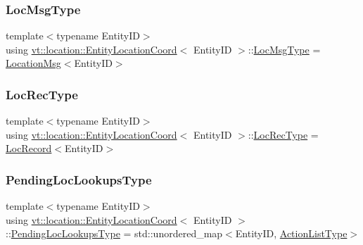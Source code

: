 \subsubsection{\texorpdfstring{Loc\+Msg\+Type}{LocMsgType}}
{\footnotesize\ttfamily template$<$typename Entity\+ID$>$ \\
using \hyperlink{structvt_1_1location_1_1_entity_location_coord}{vt\+::location\+::\+Entity\+Location\+Coord}$<$ Entity\+ID $>$\+::\hyperlink{structvt_1_1location_1_1_entity_location_coord_a8799cbd5fb0fb04cfdd1012fe1d5908f}{Loc\+Msg\+Type} =  \hyperlink{structvt_1_1location_1_1_location_msg}{Location\+Msg}$<$Entity\+ID$>$}

\mbox{\label{structvt_1_1location_1_1_entity_location_coord_a685f9eee868b7b9e01072a5b303548bc}} 
\subsubsection{\texorpdfstring{Loc\+Rec\+Type}{LocRecType}}
{\footnotesize\ttfamily template$<$typename Entity\+ID$>$ \\
using \hyperlink{structvt_1_1location_1_1_entity_location_coord}{vt\+::location\+::\+Entity\+Location\+Coord}$<$ Entity\+ID $>$\+::\hyperlink{structvt_1_1location_1_1_entity_location_coord_a685f9eee868b7b9e01072a5b303548bc}{Loc\+Rec\+Type} =  \hyperlink{structvt_1_1location_1_1_loc_record}{Loc\+Record}$<$Entity\+ID$>$}

\mbox{\label{structvt_1_1location_1_1_entity_location_coord_a495c5dfc3aa444524af9aede4b20cfdc}} 
\subsubsection{\texorpdfstring{Pending\+Loc\+Lookups\+Type}{PendingLocLookupsType}}
{\footnotesize\ttfamily template$<$typename Entity\+ID$>$ \\
using \hyperlink{structvt_1_1location_1_1_entity_location_coord}{vt\+::location\+::\+Entity\+Location\+Coord}$<$ Entity\+ID $>$\+::\hyperlink{structvt_1_1location_1_1_entity_location_coord_a495c5dfc3aa444524af9aede4b20cfdc}{Pending\+Loc\+Lookups\+Type} =  std\+::unordered\+\_\+map$<$Entity\+ID, \hyperlink{structvt_1_1location_1_1_entity_location_coord_a093712fbaa7584cb35db2b33514a719a}{Action\+List\+Type}$>$}

